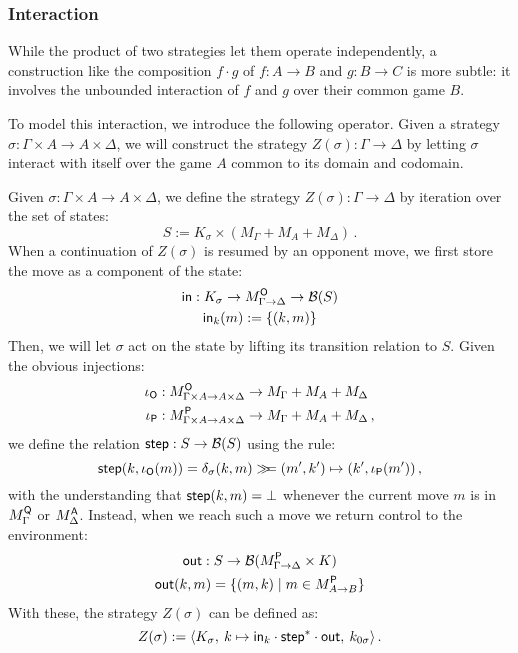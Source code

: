 
\subsubsection{Interaction} %

While the product of two strategies
let them operate independently,
a construction like the composition $f \cdot g$ of
$f : A \rightarrow B$ and $g : B \rightarrow C$
is more subtle:
it involves the unbounded interaction of $f$ and $g$
over their common game $B$.

To model this interaction,
we introduce the following operator.
Given a strategy $\sigma : \Gamma \times A \rightarrow A \times \Delta$,
we will construct the strategy $Z(\sigma) : \Gamma \rightarrow \Delta$
by letting $\sigma$ interact with itself
over the game $A$ common to its domain and codomain.

\begin{definition}
Given $\sigma : \Gamma \times A \rightarrow A \times \Delta$,
we define the strategy $Z(\sigma) : \Gamma \rightarrow \Delta$
by iteration over the set of states:
\[
    S := K_\sigma \times (M_\Gamma + M_A + M_\Delta) \,.
\]
When a continuation of $Z(\sigma)$ is resumed by an opponent move,
we first store the move as a component of the state:
\begin{gather*}
   \mathsf{in}  : K_\sigma \rightarrow
            M_{\Gamma \rightarrow \Delta}^{ \mathsf{O} } \rightarrow
            \mathcal{B}(S) \\
   \mathsf{in} _k(m) := \{ (k, m) \}
\end{gather*}
Then, we will let $\sigma$ act on the state
by lifting its transition relation to $S$.
Given the obvious injections:
\begin{align*}
  \iota_{ \mathsf{O} } &:
    M_{\Gamma \times A \rightarrow A \times \Delta}^{ \mathsf{O} }
    \rightarrow
    M_\Gamma + M_A + M_\Delta \\
  \iota_{ \mathsf{P} } &:
    M_{\Gamma \times A \rightarrow A \times \Delta}^{ \mathsf{P} }
    \rightarrow
    M_\Gamma + M_A + M_\Delta \,,
\end{align*}
we define the relation
$ \mathsf{step}  : S \rightarrow \mathcal{B}(S)$
using the rule:
\[
   \mathsf{step} (k, \iota_{ \mathsf{O} }(m)) =
    \delta_\sigma(k, m) \gg\!\!= (m', k') \mapsto (k', \iota_{ \mathsf{P} }(m')) \,,
\]
with the understanding that $ \mathsf{step} (k, m) = \bot$
whenever the current move $m$ is
in $M_\Gamma^{ \mathsf{Q} }$ or $M_\Delta^{ \mathsf{A} }$.
Instead,
when we reach such a move
we return control to the environment:
\begin{gather*}
   \mathsf{out}  : S \rightarrow
    \mathcal{B}(M_{\Gamma \rightarrow \Delta}^{ \mathsf{P} } \times K) \\
   \mathsf{out} (k, m) =
    \{ (m, k) \mid m \in M_{A \rightarrow B}^{ \mathsf{P} } \}
\end{gather*}
With these, the strategy $Z(\sigma)$ can be defined as:
\[
    Z(\sigma) := \langle
       K_\sigma, \:
       k \mapsto  \mathsf{in} _k \cdot  \mathsf{step} ^* \cdot  \mathsf{out} , \:
       k_{0\sigma}
     \rangle \,.
\]
\end{definition}

